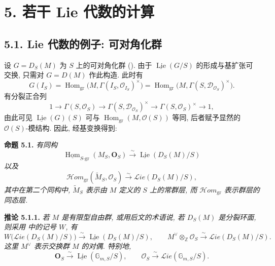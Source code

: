 
\section*{5. 若干 Lie 代数的计算}

\subsection*{5.1. Lie 代数的例子: 可对角化群}

设 \(G=D_S(M)\) 为 \(S\) 上的可对角化群 ().
由于 \(\underline{\operatorname{Lie}}(G/S)\) 的形成与基扩张可交换,
只需对 \(G=D(M)\) 作此构造. 此时有
\[
 G(I_S)=\operatorname{Hom}_{\mathrm{gr}}
   \bigl(M,\Gamma(I_S,\mathscr O_{I_S})^\times\bigr)
 =\operatorname{Hom}_{\mathrm{gr}}
   \bigl(M,\Gamma(S,\mathscr D_{\mathscr O_S})^\times\bigr).
\]
有分裂正合列
\[
 1\longrightarrow\Gamma(S,\mathscr O_S)
  \longrightarrow\Gamma(S,\mathscr D_{\mathscr O_S})^\times
  \longrightarrow\Gamma(S,\mathscr O_S)^\times
  \longrightarrow1,
\]
由此可见 \(\underline{\operatorname{Lie}}(G)(S)\) 可与
\(\operatorname{Hom}_{\mathrm{gr}}(M,\mathscr O(S))\) 等同,
后者赋予显然的 \(\mathscr O(S)\)-模结构. 因此, 经基变换得到:

\medskip
\noindent{}\textbf{命题 5.1.}
\textit{有同构}
\[
 \underline{\operatorname{Hom}}_{S\text{-}\mathrm{gr}}
      (M_S,\mathbf O_S)
 \xrightarrow{\sim}
 \underline{\operatorname{Lie}}(D_S(M)/S)
\]
\textit{以及}
\[
 \mathscr Hom_{\mathrm{gr}}(\widetilde M_S,\mathscr O_S)
 \xrightarrow{\sim}
 \mathscr Lie(D_S(M)/S),
\]
\textit{其中在第二个同构中, \(\widetilde M_S\) 表示由 \(M\) 定义的
\(S\) 上的常群层, 而 \(\mathscr Hom_{\mathrm{gr}}\) 表示群层的同态层.}

\medskip
\noindent{}\textbf{推论 5.1.1.}
\textit{若 \(M\) 是有限型自由群, 或用后文的术语说,
若 \(D_S(M)\) 是分裂环面, 则采用 中的记号 \(W\), 有}
\[
 W\bigl(\mathscr Lie(D_S(M)/S)\bigr)
   \xrightarrow{\sim}\underline{\operatorname{Lie}}(D_S(M)/S),
 \qquad
 M^\vee\otimes_{\mathbb Z}\mathscr O_S
   \xrightarrow{\sim}\mathscr Lie(D_S(M)/S).
\]
\textit{这里 \(M^\vee\) 表示交换群 \(M\) 的对偶. 特别地,}
\[
 \mathbf O_S\xrightarrow{\sim}
   \underline{\operatorname{Lie}}(\mathbb G_{m,S}/S),
 \qquad
 \mathscr O_S\xrightarrow{\sim}
   \mathscr Lie(\mathbb G_{m,S}/S).
\]

